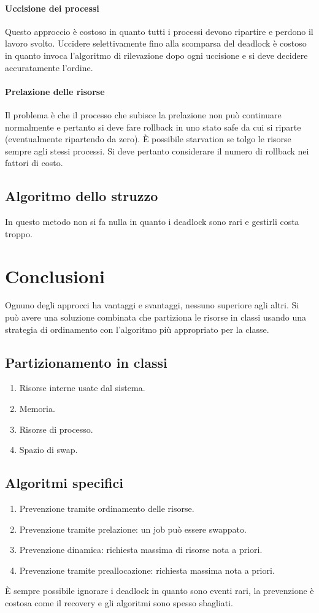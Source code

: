 \paragraph{Uccisione dei processi}
Questo approccio \`e costoso in quanto tutti i processi devono ripartire e perdono il lavoro svolto. Uccidere selettivamente fino alla scomparsa del deadlock \`e costoso in quanto
invoca l'algoritmo di rilevazione dopo ogni uccisione e si deve decidere accuratamente l'ordine. 
\paragraph{Prelazione delle risorse}
Il problema \`e che il processo che subisce la prelazione non pu\`o continuare normalmente e pertanto si deve fare rollback in uno stato safe da cui si riparte (eventualmente ripartendo
da zero). \`E possibile starvation se tolgo le risorse sempre agli stessi processi. Si deve pertanto considerare il numero di rollback nei fattori di costo. 
\subsection{Algoritmo dello struzzo}
In questo metodo non si fa nulla in quanto i deadlock sono rari e gestirli costa troppo. 
\section{Conclusioni}
Ognuno degli approcci ha vantaggi e svantaggi, nessuno superiore agli altri. Si pu\`o avere una soluzione combinata che partiziona le risorse in classi usando una strategia di 
ordinamento con l'algoritmo pi\`u appropriato per la classe.
\subsection{Partizionamento in classi}
\begin{enumerate}
	\item Risorse interne usate dal sistema.
	\item Memoria.
	\item Risorse di processo.
	\item Spazio di swap.
\end{enumerate}
\subsection{Algoritmi specifici}
\begin{enumerate}
	\item Prevenzione tramite ordinamento delle risorse.
	\item Prevenzione tramite prelazione: un job pu\`o essere swappato.
	\item Prevenzione dinamica: richiesta massima di risorse nota a priori.
	\item Prevenzione tramite preallocazione: richiesta massima nota a priori.
\end{enumerate}
\`E sempre possibile ignorare i deadlock in quanto sono eventi rari, la prevenzione \`e costosa come il recovery e gli algoritmi sono spesso sbagliati. 
